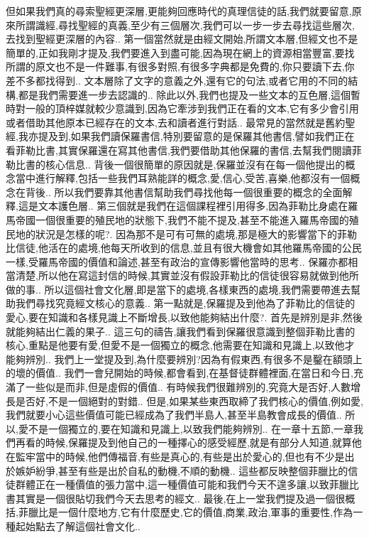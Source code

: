 \documentclass{book}
\begin{document}
但如果我們真的尋索聖經更深層,更能夠回應時代的真理信徒的話,我們就要留意,原來所謂識經,尋找聖經的真義,至少有三個層次,我們可以一步一步去尋找這些層次,去找到聖經更深層的內容..
第一個當然就是由經文開始,所謂文本層,但經文也不是簡單的,正如我剛才提及,我們要進入到盡可能,因為現在網上的資源相當豐富,要找所謂的原文也不是一件難事,有很多對照,有很多字典都是免費的,你只要讀下去,你差不多都找得到..
文本層除了文字的意義之外,還有它的句法,或者它用的不同的結構,都是我們需要進一步去認識的..
除此以外,我們也提及一些文本的互色層,這個暫時對一般的頂梓媒就較少意識到,因為它牽涉到我們正在看的文本,它有多少會引用或者借助其他原本已經存在的文本,去和讀者進行對話..
最常見的當然就是舊約聖經,我亦提及到,如果我們讀保羅書信,特別要留意的是保羅其他書信,譬如我們正在看菲勒比書,其實保羅還在寫其他書信,我們要借助其他保羅的書信,去幫我們閱讀菲勒比書的核心信息..
背後一個很簡單的原因就是,保羅並沒有在每一個他提出的概念當中進行解釋,包括一些我們耳熟能詳的概念,愛,信心,受苦,喜樂,他都沒有一個概念在背後..
所以我們要靠其他書信幫助我們尋找他每一個很重要的概念的全面解釋,這是文本護色層..
第三個就是我們在這個課程裡引用得多,因為菲勒比身處在羅馬帝國一個很重要的殖民地的狀態下,我們不能不提及,甚至不能進入羅馬帝國的殖民地的狀況是怎樣的呢?.
因為那不是可有可無的處境,那是極大的影響當下的菲勒比信徒,他活在的處境,他每天所收到的信息,並且有很大機會如其他羅馬帝國的公民一樣,受羅馬帝國的價值和論述,甚至有政治的宣傳影響他當時的思考..
保羅亦都相當清楚,所以他在寫這封信的時候,其實並沒有假設菲勒比的信徒很容易就做到他所做的事..
所以這個社會文化層,即是當下的處境,各樣東西的處境,我們需要帶進去幫助我們尋找究竟經文核心的意義..
第一點就是,保羅提及到他為了菲勒比的信徒的愛心,要在知識和各樣見識上不斷增長,以致他能夠結出什麼?.
首先是辨別是非,然後就能夠結出仁義的果子..
這三句的禱告,讓我們看到保羅很意識到整個菲勒比書的核心,重點是他要有愛,但愛不是一個獨立的概念,他需要在知識和見識上,以致他才能夠辨別..
我們上一堂提及到,為什麼要辨別?因為有假東西,有很多不是鑿在額頭上的壞的價值..
我們一會兒開始的時候,都會看到,在基督徒群體裡面,在當日和今日,充滿了一些似是而非,但是虛假的價值..
有時候我們很難辨別的,究竟大是否好,人數增長是否好,不是一個絕對的對錯..
但是,如果某些東西取締了我們核心的價值,例如愛,我們就要小心這些價值可能已經成為了我們半島人,甚至半島教會成長的價值..
所以,愛不是一個獨立的,要在知識和見識上,以致我們能夠辨別..
在一章十五節,一章我們再看的時候,保羅提及到他自己的一種擇心的感受經歷,就是有部分人知道,就算他在監牢當中的時候,他們傳福音,有些是真心的,有些是出於愛心的,但也有不少是出於嫉妒紛爭,甚至有些是出於自私的動機,不順的動機..
這些都反映整個菲臘比的信徒群體正在一種價值的張力當中,這一種價值可能和我們今天不遑多讓,以致菲臘比書其實是一個很貼切我們今天去思考的經文..
最後,在上一堂我們提及過一個很概括,菲臘比是一個什麼地方,它有什麼歷史,它的價值,商業,政治,軍事的重要性,作為一種起始點去了解這個社會文化..
\end{document}
